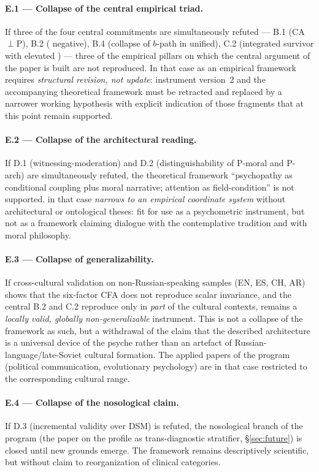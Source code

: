 \paragraph{E.1 --- Collapse of the central empirical triad.}
If three of the four central commitments are simultaneously refuted --- B.1 (CA$\perp$P), B.2 (\IMM{} negative), B.4 (collapse of $b$-path in unified), C.2 (integrated survivor with elevated \EAF) --- three of the empirical pillars on which the central argument of the paper is built are not reproduced. In that case \DEIC{} as an empirical framework requires \emph{structural revision, not update}: instrument version~2 and the accompanying theoretical framework must be retracted and replaced by a narrower working hypothesis with explicit indication of those fragments that at this point remain supported.

\paragraph{E.2 --- Collapse of the architectural reading.}
If D.1 (witnessing-moderation) and D.2 (distinguishability of P-moral and P-arch) are simultaneously refuted, the theoretical framework ``psychopathy as conditional coupling plus moral narrative; attention as field-condition'' is not supported. \DEIC{} in that case \emph{narrows to an empirical coordinate system} without architectural or ontological theses: fit for use as a psychometric instrument, but not as a framework claiming dialogue with the contemplative tradition and with moral philosophy.

\paragraph{E.3 --- Collapse of generalizability.}
If cross-cultural validation on non-Russian-speaking samples (EN, ES, CH, AR) shows that the six-factor CFA does not reproduce scalar invariance, and the central B.2 and C.2 reproduce only in \emph{part} of the cultural contexts, \DEIC{} remains a \emph{locally valid, globally non-generalizable} instrument. This is not a collapse of the framework as such, but a withdrawal of the claim that the described architecture is a universal device of the psyche rather than an artefact of Russian-language/late-Soviet cultural formation. The applied papers of the program (political communication, evolutionary psychology) are in that case restricted to the corresponding cultural range.

\paragraph{E.4 --- Collapse of the nosological claim.}
If D.3 (incremental validity over DSM) is refuted, the nosological branch of the program (the paper on the \DEIC{} profile as trans-diagnostic stratifier, §\ref{sec:future}) is closed until new grounds emerge. The framework remains descriptively scientific, but without claim to reorganization of clinical categories.

